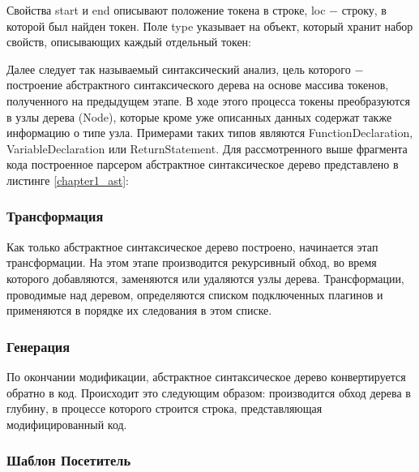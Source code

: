 \documentclass[14pt, a4paper]{article}
\begin{document}


Свойства start и end описывают положение токена в строке, loc $-$ строку, в которой был найден токен.
Поле type указывает на объект, который хранит набор свойств, описывающих каждый отдельный токен:


Далее следует так называемый синтаксический анализ, цель которого $-$ построение абстрактного
синтаксического дерева на основе массива токенов, полученного на предыдущем этапе. В ходе этого
процесса токены преобразуются в узлы дерева (Node), которые кроме уже описанных данных содержат также
информацию о типе узла. Примерами таких типов являются FunctionDeclaration, VariableDeclaration или
ReturnStatement. Для рассмотренного выше фрагмента кода построенное парсером абстрактное синтаксическое
дерево представлено в листинге \ref{chapter1_ast}:



\subsubsection*{Трансформация}
Как только абстрактное синтаксическое дерево построено, начинается этап трансформации. На этом этапе
производится рекурсивный обход, во время которого добавляются, заменяются или удаляются узлы дерева.
Трансформации, проводимые над деревом, определяются списком подключенных плагинов и применяются в
порядке их следования в этом списке.

\subsubsection*{Генерация}
По окончании модификации, абстрактное синтаксическое дерево конвертируется обратно в код.
Происходит это следующим образом: производится обход дерева в глубину, в процессе которого строится строка,
представляющая модифицированный код.

\subsubsection{Шаблон Посетитель}
\end{document}
